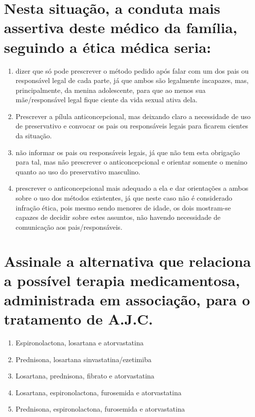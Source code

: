 \documentclass[11pt,notitlepage]{article}
\begin{document}
\section{Nesta situação, a conduta mais assertiva deste médico da família, seguindo a ética médica seria:}
\begin{multicols}{2}
	\setlength{\columnseprule}{0pt}
	\begin{enumerate}[label=(\alph*)]
		\item dizer que só pode prescrever o método pedido após falar com um dos pais ou responsável legal de cada parte, já que ambos são legalmente incapazes, mas, principalmente, da menina adolescente, para que ao menos sua mãe/responsável legal fique ciente da vida sexual ativa dela. 
		\item Prescrever a pílula anticoncepcional, mas deixando claro a necessidade de uso de preservativo e convocar os pais ou responsáveis legais para ficarem cientes da situação.
		\item não informar os pais ou responsáveis legais, já que não tem esta obrigação para tal, mas não prescrever o anticoncepcional e orientar somente o menino quanto ao uso do preservativo masculino. 
		\item prescrever o anticoncepcional mais adequado a ela e dar orientações a ambos sobre o uso dos métodos existentes, já que neste caso não é considerado infração ética, pois mesmo sendo menores de idade, os dois mostram-se capazes de decidir sobre estes assuntos, não havendo necessidade de comunicação aos pais/responsáveis.
	\end{enumerate}
\end{multicols}
\vspace{0.5cm}

\section{Assinale a alternativa que relaciona a possível terapia medicamentosa, administrada em associação, para o tratamento de A.J.C. }
\begin{multicols}{2}
	\setlength{\columnseprule}{0pt}
	\begin{enumerate}[label=(\alph*)]
		\item Espironolactona, losartana e atorvastatina
		\item Prednisona, losartana sinvastatina/ezetimiba
		\item Losartana, prednisona, fibrato e atorvastatina
		\item Losartana, espironolactona, furosemida e atorvastatina
		\item Prednisona, espironolactona, furosemida e atorvastatina
	\end{enumerate}
\end{multicols}
\vspace{0.5cm}
\end{document}
